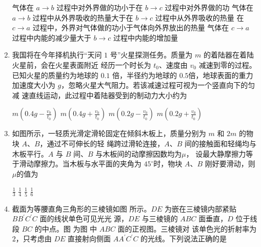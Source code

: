 \begin{enumerate}
\fourchoices
{气体在 $ a \rightarrow b $ 过程中对外界做的功小于在 $ b \rightarrow c $ 过程中对外界做的功}
{气体在 $ a \rightarrow b $ 过程中从外界吸收的热量大于在 $ b \rightarrow c $ 过程中从外界吸收的热量}
{在 $ c \rightarrow a $ 过程中，外界对气体做的功小于气体向外界放出的热量}
{气体在 $ c \rightarrow a $ 过程中内能的减少量大于 $ b \rightarrow c $ 过程中内能的增加量}





\item
我国将在今年择机执行“天问 $ 1 $ 号”火星探测任务。质量为 $ m $ 的着陆器在着陆火星前，会在火星表面附近
经历一个时长为 $ t_{0} $、速度由 $ v_{0} $ 减速到零的过程。已知火星的质量约为地球的 $ 0.1 $ 倍，半径约为地球的 $ 0.5 $倍，地球表面的重力加速度大小为 $ g $，忽略火星大气阻力。若该减速过程可视为一个竖直向下的匀减
速直线运动，此过程中着陆器受到的制动力大小约为  

\fourchoices
{$m\left(0.4 g-\frac{v_{0}}{t_{0}}\right)$}
{$ m\left(0.4 g+\frac{v_{0}}{t_{0}}\right)$}
{$ m\left(0.2 g-\frac{v_{0}}{t_{0}}\right)$}
{$ m\left(0.2 g+\frac{v_{0}}{t_{0}}\right)$}






\item
如图所示，一轻质光滑定滑轮固定在倾斜木板上，质量分别为 $ m $ 和 $ 2m $ 的物块 $ A $、$ B $，通过不可伸长的轻
绳跨过滑轮连接，$ A $、$ B $ 间的接触面和轻绳均与木板平行。$ A $ 与 $ B $ 间、$ B $ 与木板间的动摩擦因数均为$ \mu $，
设最大静摩擦力等于滑动摩擦力。当木板与水平面的夹角为 $ 45 ^{ \circ } $时，物块 $ A $、$ B $ 刚好要滑动，则$ \mu $的值为  
\begin{figure}[h!]
\centering

\end{figure}

\fourchoices
{$\frac{1}{3}$}
{$\frac{1}{4}$}
{$\frac{1}{5}$}
{$\frac{1}{6}$}








\item
截面为等腰直角三角形的三棱镜如图  所示。$ DE $ 为嵌在三棱镜内部紧贴 $ BB ^{\prime} C ^{\prime} C $ 面的线状单色可见光光
源，$ DE $ 与三棱镜的 $ ABC $ 面垂直，$ D $ 位于线段 $ BC $ 的中点。图  为图  中 $ ABC $ 面的正视图。三棱镜对
该单色光的折射率为 $ 2 $，只考虑由 $ DE $ 直接射向侧面 $ AA ^{\prime} C ^{\prime} C $ 的光线。下列说法正确的是  
\begin{figure}[h!]
\centering
\begin{subfigure}{0.3\linewidth}
\centering
 
\caption{}\label{2020:山东:9a}
\end{subfigure}
\begin{subfigure}{0.3\linewidth}
\centering
 
\caption{}\label{2020:山东:9b}
\end{subfigure}
\end{figure}



\end{enumerate}
